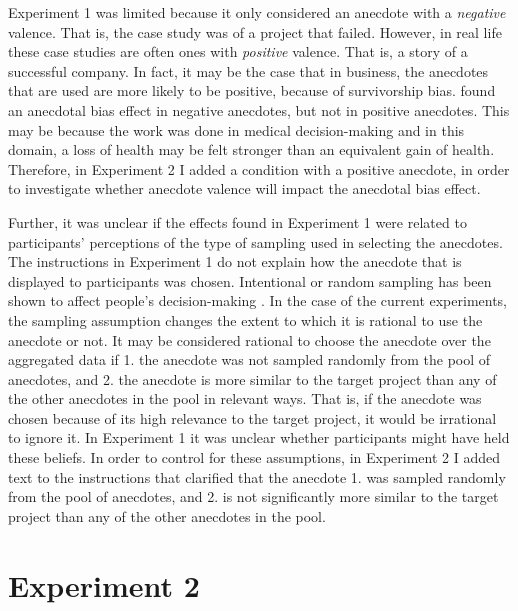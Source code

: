 \documentclass[a4paper, nobind, dvipsnames]{templates/ociamthesis}
\theoremstyle{definition}
\theoremstyle{definition}
\theoremstyle{definition}
\theoremstyle{definition}
\theoremstyle{remark}
\begin{document}
Experiment 1 was limited because it only considered an anecdote with a
\emph{negative} valence. That is, the case study was of a project that failed.
However, in real life these case studies are often ones with \emph{positive} valence.
That is, a story of a successful company. In fact, it may be the case that in
business, the anecdotes that are used are more likely to be positive, because of
survivorship bias. \textcite{jaramillo2019} found an anecdotal bias effect in negative
anecdotes, but not in positive anecdotes. This may be because the work was done
in medical decision-making and in this domain, a loss of health may be felt
stronger than an equivalent gain of health. Therefore, in Experiment 2 I added a
condition with a positive anecdote, in order to investigate whether anecdote
valence will impact the anecdotal bias effect.

Further, it was unclear if the effects found in Experiment 1 were related to
participants' perceptions of the type of sampling used in selecting the
anecdotes. The instructions in Experiment 1 do not explain how the anecdote that
is displayed to participants was chosen. Intentional or random sampling has been
shown to affect people's decision-making \autocite[e.g.,][]{hayes2019}. In the case of the
current experiments, the sampling assumption changes the extent to which it is
rational to use the anecdote or not. It may be considered rational to choose the
anecdote over the aggregated data if 1. the anecdote was not sampled randomly
from the pool of anecdotes, and 2. the anecdote is more similar to the target
project than any of the other anecdotes in the pool in relevant ways. That is,
if the anecdote was chosen because of its high relevance to the target project,
it would be irrational to ignore it. In Experiment 1 it was unclear whether
participants might have held these beliefs. In order to control for these
assumptions, in Experiment 2 I added text to the instructions that clarified
that the anecdote 1. was sampled randomly from the pool of anecdotes, and 2. is
not significantly more similar to the target project than any of the other
anecdotes in the pool.

\hypertarget{anecdotes-2}{%
\section{Experiment 2}\label{anecdotes-2}}
\end{document}
